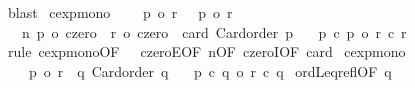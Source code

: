 \begin{isabellebody}
\ blast\isanewline
{}\isamarkupfalse%
%
\endisatagproof
{\isafoldproof}%
%
\isadelimproof
\isanewline
%
\endisadelimproof
\isanewline
{}\isamarkupfalse%
\ cexp{\isacharunderscore}{\kern0pt}mono{\isacharcolon}{\kern0pt}\isanewline
\ \ \ {}{\isacharcolon}{\kern0pt}\ {\isachardoublequoteopen}p{}\ {\isasymle}o\ r{}{\isachardoublequoteclose}\ \ {}{\isacharcolon}{\kern0pt}\ {\isachardoublequoteopen}p{}\ {\isasymle}o\ r{}{\isachardoublequoteclose}\isanewline
\ \ \ n{\isacharcolon}{\kern0pt}\ {\isachardoublequoteopen}p{}\ {\isacharequal}{\kern0pt}o\ czero\ {\isasymLongrightarrow}\ r{}\ {\isacharequal}{\kern0pt}o\ czero{\isachardoublequoteclose}\ \ card{\isacharcolon}{\kern0pt}\ {\isachardoublequoteopen}Card{\isacharunderscore}{\kern0pt}order\ p{}{\isachardoublequoteclose}\isanewline
\ \ \ {\isachardoublequoteopen}p{}\ {\isacharcircum}{\kern0pt}c\ p{}\ {\isasymle}o\ r{}\ {\isacharcircum}{\kern0pt}c\ r{}{\isachardoublequoteclose}\isanewline
%
\isadelimproof
\ \ %
\endisadelimproof
%
\isatagproof
{}\isamarkupfalse%
\ {\isacharparenleft}{\kern0pt}rule\ cexp{\isacharunderscore}{\kern0pt}mono{\isacharprime}{\kern0pt}{\isacharbrackleft}{\kern0pt}OF\ {}\ {}\ czeroE{\isacharbrackleft}{\kern0pt}OF\ n{\isacharbrackleft}{\kern0pt}OF\ czeroI{\isacharbrackleft}{\kern0pt}OF\ card{\isacharbrackright}{\kern0pt}{\isacharbrackright}{\kern0pt}{\isacharbrackright}{\kern0pt}{\isacharbrackright}{\kern0pt}{\isacharparenright}{\kern0pt}%
\endisatagproof
{\isafoldproof}%
%
\isadelimproof
\isanewline
%
\endisadelimproof
\isanewline
{}\isamarkupfalse%
\ cexp{\isacharunderscore}{\kern0pt}mono{}{\isacharcolon}{\kern0pt}\isanewline
\ \ \ {}{\isacharcolon}{\kern0pt}\ {\isachardoublequoteopen}p{}\ {\isasymle}o\ r{}{\isachardoublequoteclose}\ \ q{\isacharcolon}{\kern0pt}\ {\isachardoublequoteopen}Card{\isacharunderscore}{\kern0pt}order\ q{\isachardoublequoteclose}\isanewline
\ \ \ {\isachardoublequoteopen}p{}\ {\isacharcircum}{\kern0pt}c\ q\ {\isasymle}o\ r{}\ {\isacharcircum}{\kern0pt}c\ q{\isachardoublequoteclose}\isanewline
%
\isadelimproof
%
\endisadelimproof
%
\isatagproof
{}\isamarkupfalse%
\ ordLeq{\isacharunderscore}{\kern0pt}refl{\isacharbrackleft}{\kern0pt}OF\ q{\isacharbrackright}{\kern0pt}\ \isamarkupfalse%

\end{isabellebody}
